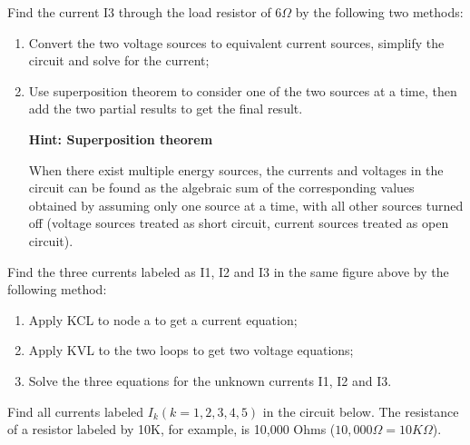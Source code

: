 \item Find the current I3 through the load resistor of 6$\Omega$ by the
following two methods:
\begin{enumerate}
\item Convert the two voltage sources to equivalent current sources, 
	simplify the circuit and solve for the current;
\item Use superposition theorem to consider one of the two sources at a
  time, then add the two partial results to get the final result.

{\bf Hint: Superposition theorem}

When there exist multiple energy sources, the currents and voltages in 
the circuit can be found as the algebraic sum of the corresponding values 
obtained by assuming only one source at a time, with all other sources 
turned off (voltage sources treated as short circuit, current sources 
treated as open circuit).

\end{enumerate}



\item Find the three currents labeled as I1, I2 and I3 in the same figure 
	above by the following method:
\begin{enumerate}
\item Apply KCL to node a to get a current equation;
\item Apply KVL to the two loops to get two voltage equations;
\item Solve the three equations for the unknown currents I1, I2 and I3.
\end{enumerate}


\item Find all currents labeled $I_k (k=1,2,3,4,5)$ in the circuit below. 
The resistance of a resistor labeled by 10K, for example, is 10,000
Ohms ($10,000 \Omega=10K\Omega$).

